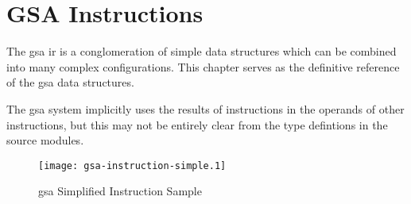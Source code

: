 \newcommand{\voperands}[1]{\subsubsection{Operands} #1}
\newcommand{\noperands}{\voperands{There are no operands.}}

\newenvironment{seealso}{\subsubsection{See Also}}{}

\newcommand{\info}[7]{
  \label{inst:#7-#6}
  \vspace{-3\baselineskip}\begin{flushright}\small{#5}\end{flushright}
  \vspace{-.30\baselineskip}
  \begin{minipage}[t]{.55\textwidth}#4\end{minipage}\hfill
  \begin{minipage}[t]{.35\textwidth}
    \begin{small}
      \begin{flushright}
        [#2, #3] {\linebreak}
        #1 {\linebreak}
      \end{flushright}
    \end{small}
  \end{minipage}
  \begin{figure}[h!]
    \texttt{[image: gen-gsa-instruction-\#6.1]}
    \caption{\gsainst{#6}}\label{fig:instruction-#7-#6}
  \end{figure}
}


\chapter{GSA Instructions}

The \ac{gsa} \ac{ir} is a conglomeration of simple data structures
which can be combined into many complex configurations.  This chapter
serves as the definitive reference of the \ac{gsa} data structures.

The \ac{gsa} system implicitly uses the results of instructions in the
operands of other instructions, but this may not be entirely clear
from the type defintions in the source modules.

\begin{figure}[h!]
\texttt{[image: gsa-instruction-simple.1]}
\caption{\ac{gsa} Simplified Instruction Sample}\label{fig:instruction-simple}
\end{figure}

